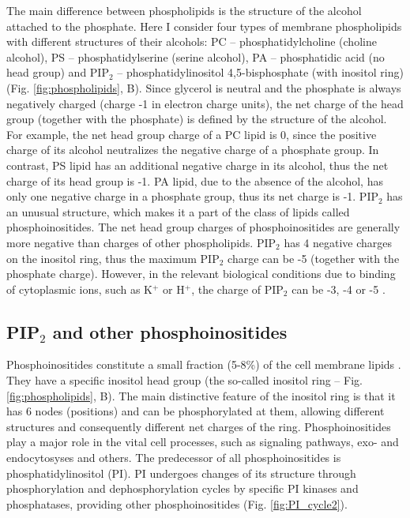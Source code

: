 The main difference between phospholipids is the structure of the alcohol attached to the phosphate. Here I consider four types of membrane phospholipids with different structures of their alcohols: PC -- phosphatidylcholine (choline alcohol), PS -- phosphatidylserine (serine alcohol), PA -- phosphatidic acid (no head group) and PIP$_2$ -- phosphatidylinositol 4,5-bisphosphate (with inositol ring) (Fig. \ref{fig:phospholipids}, B). Since glycerol is neutral and the phosphate is always negatively charged (charge -1 in electron charge units), the net charge of the head group (together with the phosphate) is defined by the structure of the alcohol. For example, the net head group charge of a PC lipid is 0, since the positive charge of its alcohol neutralizes the negative charge of a phosphate group. In contrast, PS lipid has an additional negative charge in its alcohol, thus the net charge of its head group is -1. PA lipid, due to the absence of the alcohol, has only one negative charge in a phosphate group, thus its net charge is -1. PIP$_2$ has an unusual structure, which makes it a part of the class of lipids called phosphoinositides. The net head group charges of phosphoinositides are generally more negative than charges of other phospholipids. PIP$_2$ has 4 negative charges on the inositol ring, thus the maximum PIP$_2$ charge can be -5 (together with the phosphate charge). However, in the relevant biological conditions due to binding of cytoplasmic ions, such as K$^+$ or H$^+$, the charge of PIP$_2$ can be -3, -4 or -5 \cite{McLaughlin2002}.

\subsection{PIP$_2$ and other phosphoinositides}

\label{phosphoinositides}

Phosphoinositides constitute a small fraction (5-8\%) of the cell membrane lipids \cite{Cockcroft2001}. They have a specific inositol head group (the so-called inositol ring -- Fig. \ref{fig:phospholipids}, B). The main distinctive feature of the inositol ring is that it has 6 nodes (positions) and can be phosphorylated at them, allowing different structures and consequently different net charges of the ring. Phosphoinositides play a major role in the vital cell processes, such as signaling pathways, exo- and endocytosyses and others. The predecessor of all phosphoinositides is phosphatidylinositol (PI). PI undergoes changes of its structure through phosphorylation and dephosphorylation cycles by specific PI kinases and phosphatases, providing other phosphoinositides (Fig. \ref{fig:PI_cycle2}).


